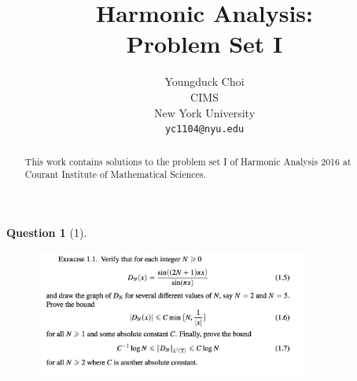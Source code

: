\documentclass{article} %
\title{Harmonic Analysis:  \\
Problem Set I}
\author{
Youngduck Choi \\
CIMS \\
New York University\\
\texttt{yc1104@nyu.edu} \\
}
\theoremstyle{quest}
\newtheorem*{question}{Question}
\begin{document}
\maketitle

\begin{abstract}
This work contains solutions to the problem set I
of Harmonic Analysis 2016 at Courant Institute of Mathematical Sciences.
\end{abstract}

\begin{question}[1]
\hfill
\begin{figure}[h!]
  \centering
    \includegraphics[width=0.8\textwidth]{HA-1-1.png}
\end{figure}
\end{question}
\end{document}
